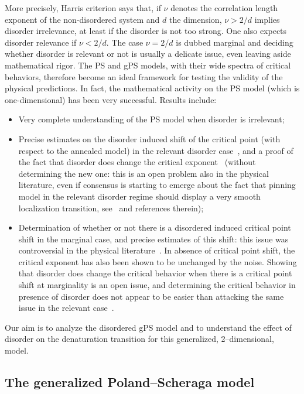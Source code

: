 \documentclass[11pt]{article}
\theoremstyle{definition}
\numberwithin{equation}{section}
\numberwithin{figure}{section}
\numberwithin{table}{section}
\begin{document}
More precisely, Harris criterion says that, if $\nu$ denotes the correlation length exponent of the non-disordered system and $d $ the dimension, $\nu >2/d$ implies disorder irrelevance, at least if the disorder is not too strong. One also expects disorder relevance if $\nu< 2/d$. The case $\nu= 2/d$ is dubbed marginal and deciding whether disorder is relevant or not is usually a delicate issue, even leaving aside mathematical rigor. The PS and gPS models, with their wide spectra of critical behaviors, therefore become an ideal framework for testing the validity of the physical predictions. In fact, the mathematical activity on the PS model (which is one-dimensional) has been very successful. Results include:
\begin{itemize}
\item Very complete understanding of the PS model when disorder is irrelevant\linebreak\cite{cf:A08,cf:G,cf:Lac,cf:Ton08};
\item Precise estimates on the disorder induced shift of the critical point (with respect to the annealed model) in the relevant disorder case~\cite{cf:AZ09,cf:DGLT09}, and a proof of the fact that disorder does change the critical exponent~\cite{cf:CH13,cf:GT06} (without determining the new one: this is an open problem also in the physical literature, even if consensus is starting to emerge about the fact that pinning model in the relevant disorder regime should display a very smooth localization transition, see~\cite{cf:BGL,cf:DR} and references therein);
\item Determination of whether or not there is a disordered induced critical point shift in the marginal case, and precise estimates of this shift: this issue was controversial in the physical literature~\cite{cf:BL16,cf:1GLT10}. In absence of critical point shift, the critical exponent has also been shown to be unchanged by the noise. Showing that disorder does change the critical behavior when there is a critical point shift at marginality is an open issue, and determining the critical behavior in presence of disorder does not appear to be easier than attacking the same issue in the relevant case~\cite{cf:DR}.
\end{itemize}

Our aim is to analyze the disordered gPS model and to understand the effect of disorder on the denaturation transition for this generalized, 2--dimensional, model.

\subsection{The generalized Poland--Scheraga model}\label{sec:model}
\end{document}
